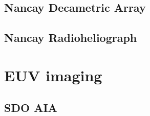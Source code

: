 \subsection{Nancay Decametric Array}\label{sec:21}

\subsection{Nancay Radioheliograph}\label{sec:22}



\section{EUV imaging}\label{sec:3}

\subsection{SDO AIA}\label{sec:30}



